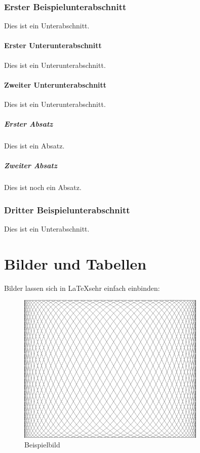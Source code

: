 \documentclass[12pt,oneside,a4paper,bibtotoc,liststotoc]{scrreprt}
\begin{document}
\subsection{Erster Beispielunterabschnitt}

Dies ist ein Unterabschnitt.

\subsubsection{Erster Unterunterabschnitt}

Dies ist ein Unterunterabschnitt.

\subsubsection{Zweiter Unterunterabschnitt}

Dies ist ein Unterunterabschnitt.

\paragraph{Erster Absatz} Dies ist ein Absatz.

\paragraph{Zweiter Absatz} Dies ist noch ein Absatz.

\subsection{Dritter Beispielunterabschnitt}
\label{dritter_beispielunterabschnitt}

Dies ist ein Unterabschnitt.

\chapter{Bilder und Tabellen}

Bilder lassen sich in \LaTeX sehr einfach einbinden:

\begin{figure}[H]
  \begin{centering}
    \includegraphics[width=0.8\textwidth]{img/example.png}
    \caption{Beispielbild}
    \label{example_image}
  \end{centering}
\end{figure}
\end{document}
